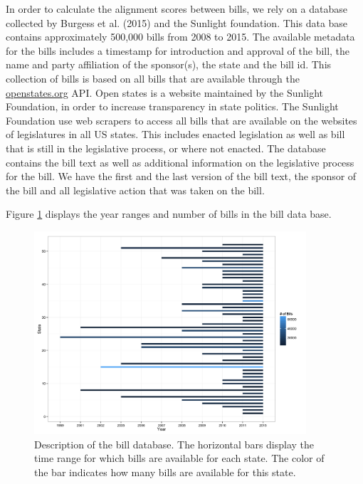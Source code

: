 \documentclass[12pt]{article} %
\begin{document}
In order to calculate the alignment scores between bills, we rely on a database collected by Burgess et al. (2015) and the Sunlight foundation. This data base contains approximately 500,000 bills from 2008 to 2015. The available metadata for the bills includes a timestamp for introduction and approval of the bill, the name and party affiliation of the sponsor(s), the state and the bill id.  This collection of bills is based on all bills that are available through the \url{openstates.org} API. Open states is a website maintained by the Sunlight Foundation, in order to increase transparency in state politics. The Sunlight Foundation use web scrapers to access all bills that are available on the websites of legislatures in all US states. This includes enacted legislation as well as bill that is still in the legislative process, or where not enacted. The database contains the bill text as well as additional information on the legislative process for the bill. We have the first and the last version of the bill text, the sponsor of the bill and all legislative action that was taken on the bill. 

Figure \ref{fig:bill_desc} displays the year ranges and number of bills in the bill data base.

\begin{figure}[ht!]
    \centering
    \includegraphics[width=0.9\textwidth]{figures/year_count_by_state.png}
    \caption{Description of the bill database. The horizontal bars display the time range for which bills are available for each state. The color of the bar indicates how many bills are available for this state.}
    \label{fig:bill_desc}
\end{figure}
\end{document}
